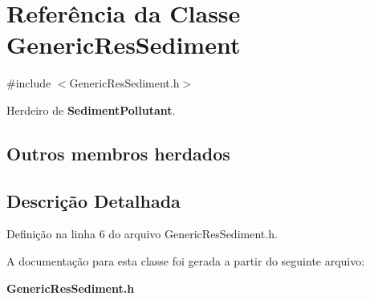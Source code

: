 \section{Referência da Classe Generic\+Res\+Sediment}
\label{class_generic_res_sediment}


{\ttfamily \#include $<$Generic\+Res\+Sediment.\+h$>$}



Herdeiro de {\bf Sediment\+Pollutant}.

\subsection*{Outros membros herdados}


\subsection{Descrição Detalhada}


Definição na linha 6 do arquivo Generic\+Res\+Sediment.\+h.



A documentação para esta classe foi gerada a partir do seguinte arquivo\+:\begin{DoxyCompactItemize}
\item 
{\bf Generic\+Res\+Sediment.\+h}\end{DoxyCompactItemize}
